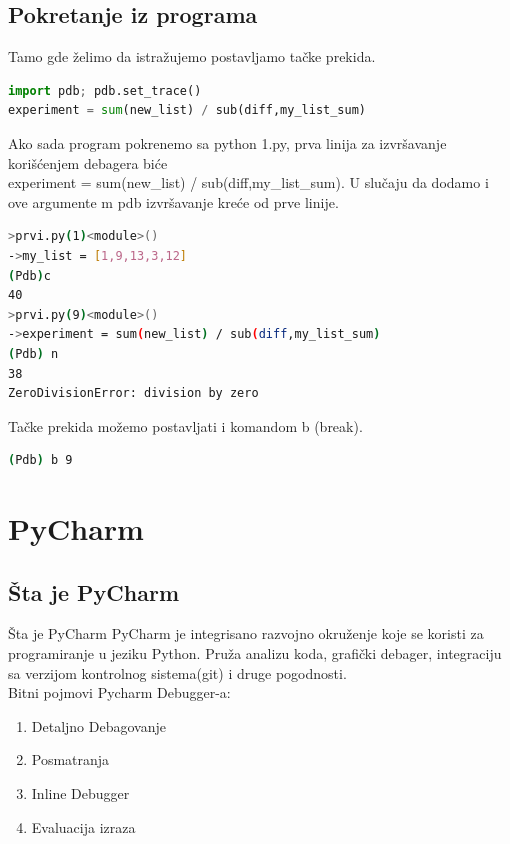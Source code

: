 \documentclass{beamer}
\begin{document}
\subsection{Pokretanje iz programa}
\begin{frame}[fragile]
Tamo gde želimo da istražujemo postavljamo tačke prekida.
\begin{lstlisting}[language = python]
import pdb; pdb.set_trace()
experiment = sum(new_list) / sub(diff,my_list_sum)
\end{lstlisting}
Ako sada program pokrenemo sa {\color{blue}python 1.py}, prva linija za izvršavanje korišćenjem debagera biće \\{\color{blue}experiment = sum(new\_list) / sub(diff,my\_list\_sum)}. U slučaju da dodamo i ove argumente {\color{blue}\textendash m  pdb} izvršavanje kreće od prve linije.
\begin{lstlisting}[language = bash]
>prvi.py(1)<module>()
->my_list = [1,9,13,3,12]
(Pdb)c
40
>prvi.py(9)<module>()
->experiment = sum(new_list) / sub(diff,my_list_sum)
(Pdb) n
38
ZeroDivisionError: division by zero
\end{lstlisting}
Tačke prekida možemo postavljati i komandom b (break).  
\begin{lstlisting}[language = bash]
(Pdb) b 9 
\end{lstlisting}

\end{frame}   


\section{PyCharm}
\subsection{Šta je PyCharm}
\begin{frame}{Šta je PyCharm}
PyCharm je integrisano razvojno okruženje koje se koristi za programiranje u jeziku Python. Pruža analizu koda, grafički debager, integraciju sa verzijom kontrolnog sistema(git) i druge pogodnosti.\\
Bitni pojmovi Pycharm Debugger-a:
\begin{enumerate}
    \item Detaljno Debagovanje
    \item Posmatranja
    \item Inline Debugger
    \item Evaluacija izraza
\end{enumerate}
\end{frame}
\end{document}
